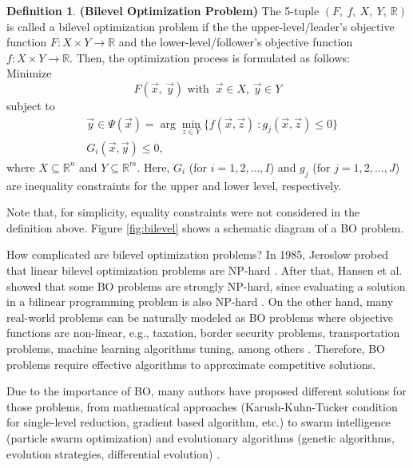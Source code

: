 \documentclass[conference]{IEEEtran}
\theoremstyle{definition}
\newtheorem{definition}{Definition}[section]
\begin{document}
\begin{definition}\textbf{(Bilevel Optimization Problem)}
    The 5-tuple $(F, \ f, \ X, \ Y, \ \mathbb{R} )$ is called a bilevel optimization
    problem if the the upper-level/leader's objective function
    $F: X \times Y \to \mathbb{R}$ and the lower-level/follower's objective
    function $f: X \times Y \to \mathbb{R}$. Then, the optimization process is
    formulated as follows:\\
    \noindent
    Minimize
    \begin{equation}
        F(\vec{x},\ \vec{y}) \text{ with } \ \vec{x} \in X , \ \vec{y} \in Y 
        \label{eqn:minF1}
    \end{equation}
    subject to
    \begin{align}
        \label{eqn:y-arg}
        &\vec{y} \in \Psi(\vec{x}) = \arg \min_{z\in Y} \{ f(\vec{x}, \vec{z}) \ : g_j(\vec{x}, \vec{z})  \leq 0 \} \\
        &  G_{i}(\vec{x}, \vec{y}) \leq 0,
    \end{align}
    where $X \subseteq \mathbb{R}^n $
    and $Y \subseteq \mathbb{R}^m$.
    Here, $G_i$ (for $i = 1,2,\ldots,I$) and $g_j$ (for $j = 1,2,\ldots,J$) are
    inequality constraints for the upper and lower level, respectively.
\end{definition}
% 
Note that, for simplicity, equality constraints were not considered in the definition
above. Figure \ref{fig:bilevel} shows a schematic diagram of a BO problem.
% 

How complicated are bilevel optimization problems?  In 1985, Jeroslow probed that
linear bilevel optimization problems are NP-hard \cite{jeroslow1985polynomial}.
After that, Hansen et al. showed that some BO problems are strongly NP-hard, since
evaluating a solution in a bilinear programming problem is also NP-hard
\cite{hansen1992new,vicente1994descent}. On the other hand, many real-world problems can
be naturally modeled as BO problems \cite{sinha2018review} where objective functions
are non-linear, e.g., taxation, border security problems, transportation problems,
machine learning algorithms tuning, among others \cite{bard2013practical,sinha2018review,arroyo2010bilevel}.
Therefore, BO problems require effective algorithms to approximate competitive
solutions.

Due to the importance of BO, many authors have proposed different solutions
for those problems, from mathematical approaches (Karush-Kuhn-Tucker condition for
single-level reduction, gradient based algorithm, etc.) \cite{dempe2002foundations,shi2005extended}
to swarm intelligence (particle swarm optimization) and evolutionary algorithms
(genetic algorithms, evolution strategies, differential evolution)
\cite{derrac2011practical,angelo2013differential,li2006hierarchical}.
\end{document}
